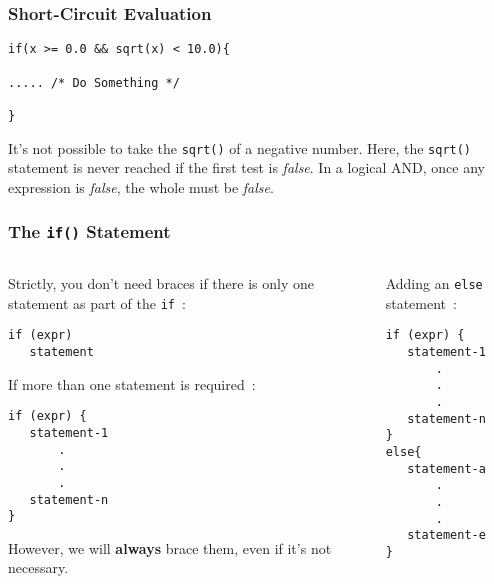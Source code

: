 \begin{frame}[fragile]
\frametitle{Short-Circuit Evaluation}

\begin{lstlisting}[style=basicc,numbers=none]
if(x >= 0.0 && sqrt(x) < 10.0){

..... /* Do Something */

}
\end{lstlisting}

It's not possible to take the \verb^sqrt()^ of a negative number.
Here, the \verb^sqrt()^ statement is never reached if the first test is {\it false}.
In a logical AND, once any expression is {\it false}, the whole must
be {\it false}.
\end{frame}


\begin{frame}[fragile]
\frametitle{The {\tt if()} Statement}

\begin{columns}

\begin{column}{0.45\textwidth}
Strictly, you don't need braces if there is only one statement as part of the {\tt if}~:
\begin{lstlisting}[style=basicc,numbers=none]
if (expr)
   statement
\end{lstlisting}

If more than one statement is required~:
\begin{lstlisting}[style=basicc,numbers=none]
if (expr) {
   statement-1
       .
       .
       .
   statement-n
}
\end{lstlisting}
However, we will {\bf always} brace them, even if it's not necessary.
\end{column}

\begin{column}{0.45\textwidth}
Adding an \verb^else^ statement~:

\begin{lstlisting}[style=basicc,numbers=none]
if (expr) {
   statement-1
       .
       .
       .
   statement-n
}
else{
   statement-a
       .
       .
       .
   statement-e
}
\end{lstlisting}
\end{column}

\end{columns}
\end{frame}


